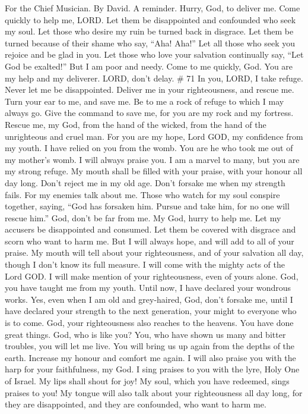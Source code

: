 For the Chief Musician. By David. A reminder.  Hurry, God,
to deliver me. Come quickly to help me, LORD.  Let them be
disappointed and confounded who seek my soul. Let those who desire my
ruin be turned back in disgrace.  Let them be turned because
of their shame who say, ``Aha! Aha!''  Let all those who
seek you rejoice and be glad in you. Let those who love your salvation
continually say, ``Let God be exalted!''  But I am poor and
needy. Come to me quickly, God. You are my help and my deliverer. LORD,
don't delay. \# 71  In you, LORD, I take refuge. Never let
me be disappointed.  Deliver me in your righteousness, and
rescue me. Turn your ear to me, and save me.  Be to me a
rock of refuge to which I may always go. Give the command to save me,
for you are my rock and my fortress.  Rescue me, my God,
from the hand of the wicked, from the hand of the unrighteous and cruel
man.  For you are my hope, Lord GOD, my confidence from my
youth.  I have relied on you from the womb. You are he who
took me out of my mother's womb. I will always praise you. 
I am a marvel to many, but you are my strong refuge.  My
mouth shall be filled with your praise, with your honour all day long.
 Don't reject me in my old age. Don't forsake me when my
strength fails.  For my enemies talk about me. Those who
watch for my soul conspire together,  saying, ``God has
forsaken him. Pursue and take him, for no one will rescue him.''
 God, don't be far from me. My God, hurry to help me.
 Let my accusers be disappointed and consumed. Let them be
covered with disgrace and scorn who want to harm me.  But I
will always hope, and will add to all of your praise.  My
mouth will tell about your righteousness, and of your salvation all day,
though I don't know its full measure.  I will come with the
mighty acts of the Lord GOD. I will make mention of your righteousness,
even of yours alone.  God, you have taught me from my
youth. Until now, I have declared your wondrous works. 
Yes, even when I am old and grey-haired, God, don't forsake me, until I
have declared your strength to the next generation, your might to
everyone who is to come.  God, your righteousness also
reaches to the heavens. You have done great things. God, who is like
you?  You, who have shown us many and bitter troubles, you
will let me live. You will bring us up again from the depths of the
earth.  Increase my honour and comfort me again.
 I will also praise you with the harp for your
faithfulness, my God. I sing praises to you with the lyre, Holy One of
Israel.  My lips shall shout for joy! My soul, which you
have redeemed, sings praises to you!  My tongue will also
talk about your righteousness all day long, for they are disappointed,
and they are confounded, who want to harm me.

